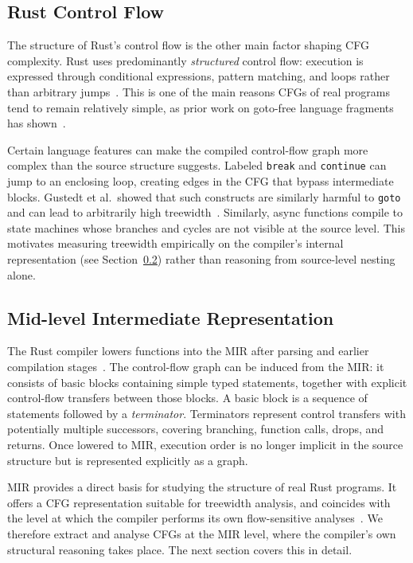 \subsection{Rust Control Flow}
\label{subsec:rust-control-flow}

The structure of Rust's control flow is the other main factor shaping CFG complexity.
Rust uses predominantly \emph{structured} control flow: execution is expressed through conditional expressions, pattern matching, and loops rather than arbitrary jumps~\cite[Ch.~8.2.13]{rust_reference}.
This is one of the main reasons CFGs of real programs tend to remain relatively simple, as prior work on goto-free language fragments has shown~\cite{thorup_1998}.

Certain language features can make the compiled control-flow graph more complex than the source structure suggests.
Labeled \texttt{break} and \texttt{continue} can jump to an enclosing loop, creating edges in the CFG that bypass intermediate blocks.
Gustedt et al.\ showed that such constructs are similarly harmful to \texttt{goto} and can lead to arbitrarily high treewidth~\cite{gustedt_2002}.
Similarly, async functions compile to state machines whose branches and cycles are not visible at the source level.
This motivates measuring treewidth empirically on the compiler's internal representation (see Section~\ref{subsec:mir}) rather than reasoning from source-level nesting alone.

\subsection{Mid-level Intermediate Representation}
\label{subsec:mir}

The Rust compiler lowers functions into the MIR after parsing and earlier compilation stages~\cite[Ch.~44]{rustc_dev_guide}.
The control-flow graph can be induced from the MIR: it consists of basic blocks containing simple typed statements, together with explicit control-flow transfers between those blocks.
A basic block is a sequence of statements followed by a \emph{terminator}.
Terminators represent control transfers with potentially multiple successors, covering branching, function calls, drops, and returns.
Once lowered to MIR, execution order is no longer implicit in the source structure but is represented explicitly as a graph.

MIR provides a direct basis for studying the structure of real Rust programs.
It offers a CFG representation suitable for treewidth analysis, and coincides with the level at which the compiler performs its own flow-sensitive analyses~\cite[Ch.~44]{rustc_dev_guide}.
We therefore extract and analyse CFGs at the MIR level, where the compiler's own structural reasoning takes place.
The next section covers this in detail.
